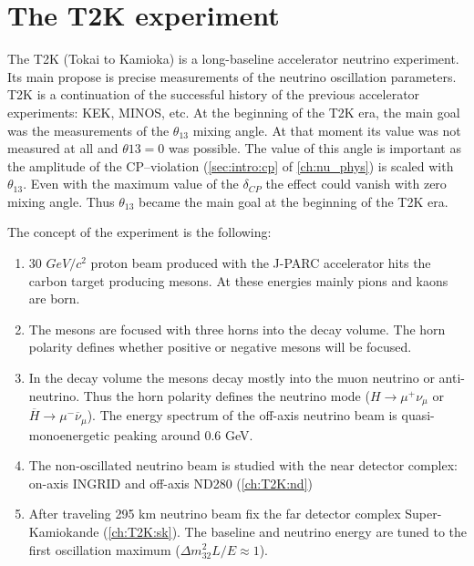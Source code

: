 \documentclass[../main.tex]{subfiles}
\begin{document}
\renewcommand{\labelitemi}{\ding{226}}
\renewcommand{\labelitemii}{\ding{227}}

\chapter{The T2K experiment}
\label{part:T2K:general}

The T2K (Tokai to Kamioka) is a long-baseline accelerator neutrino experiment. Its main propose is precise measurements of the neutrino oscillation parameters. T2K is a continuation of the successful history of the previous accelerator experiments: KEK, MINOS, etc. At the beginning of the T2K era, the main goal was the measurements of the $\theta_{13}$ mixing angle. At that moment its value was not measured at all and $\theta{13}=0$ was possible. The value of this angle is important as the amplitude of the CP--violation (\autoref{sec:intro:cp} of \autoref{ch:nu_phys}) is scaled with $\theta_{13}$. Even with the maximum value of the $\delta_{CP}$ the effect could vanish with zero mixing angle. Thus $\theta_{13}$ became the main goal at the beginning of the T2K era.

The concept of the experiment is the following:
\begin{enumerate}
  \item 30 $GeV/c^2$ proton beam produced with the J-PARC accelerator hits the carbon target producing mesons. At these energies mainly pions and kaons are born.
  \item The mesons are focused with three horns into the decay volume. The horn polarity defines whether positive or negative mesons will be focused.
  \item In the decay volume the mesons decay mostly into the muon neutrino or anti-neutrino. Thus the horn polarity defines the neutrino mode ($H\to\mu^+\nu_{\mu}$ or $\overline{H}\to\mu^-\overline{\nu}_{\mu}$). The energy spectrum of the off-axis neutrino beam is quasi-monoenergetic peaking around 0.6 GeV.
  \item The non-oscillated neutrino beam is studied with the near detector complex: on-axis INGRID and off-axis ND280 (\autoref{ch:T2K:nd})
  \item After traveling 295 km neutrino beam fix the far detector complex Super-Kamiokande (\autoref{ch:T2K:sk}). The baseline and neutrino energy are tuned to the first oscillation maximum ($\Delta m ^2_{32}L/E\approx1$).
\end{enumerate}
\end{document}
